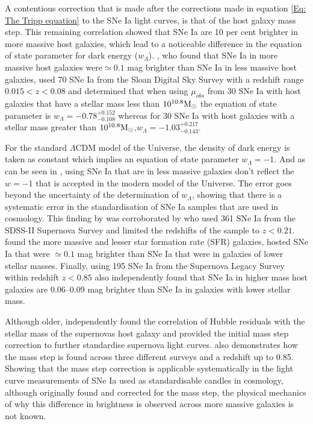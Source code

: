 A contentious correction that is made after the corrections made in equation \ref{Eq: The Tripp equation} to the SNe Ia light curves, is that of the host galaxy mass step\parencite{kelly_hubble_2010,sullivan_dependence_2010, lampeitl_effect_2010}. This remaining correlation showed that SNe Ia are 10 per cent brighter in more massive host galaxies, which lead to a noticeable difference in the equation of state parameter for dark energy (\(w_{\Lambda}\)). \textcite{kelly_hubble_2010}, who found that SNe Ia in more massive host galaxies were\(\simeq 0.1\) mag brighter than SNe Ia in less massive host galaxies, used 70 SNe Ia from the Sloan Digital Sky Survey with a redshift range \(0.015<z<0.08\) and determined that when using \(\mu_{obs}\) from 30 SNe Ia with host galaxies that have a stellar mass less than \(10^{10.8}\textup{M}_\odot\) the equation of state parameter is  \(w_{\Lambda} = -0.78^{+0.152}_{-0.108}\) whereas for 30 SNe Ia with host galaxies with a stellar mass greater than \(10^{10.8}\textup{M}_\odot\),\(w_{\Lambda} = -1.03^{+0.217}_{-0.143}\).

For the standard \(\Lambda\)CDM model of the Universe, the density of dark energy is taken as constant which implies an equation of state parameter \(w_{\Lambda}=-1\). And as can be seen in \textcite{kelly_hubble_2010}, using SNe Ia that are in less massive galaxies don't reflect the \(w=-1\) that is accepted in the modern model of the Universe. The error goes beyond the uncertainty of the determination of \(w_{\Lambda}\), showing that there is a systematic error in the standardisation of SNe Ia samples that are used in cosmology. This finding by \textcite{kelly_hubble_2010} was corroborated by \textcite{lampeitl_effect_2010} who used 361 SNe Ia from the SDSS-II Supernova Survey and limited the redshifts of the sample to \(z<0.21\). \textcite{lampeitl_effect_2010} found the more massive and lesser star formation rate (SFR) galaxies, hosted SNe Ia that were \(\simeq 0.1\) mag brighter than SNe Ia that were in galaxies of lower stellar masses. Finally, \textcite{sullivan_dependence_2010} using 195 SNe Ia from the Supernova Legacy Survey within redshift \(z <0.85\) also independently found that SNe Ia in higher mass host galaxies are 0.06–0.09 mag brighter than SNe Ia in galaxies with lower stellar mass. 

Although older, \textcite{kelly_hubble_2010,sullivan_dependence_2010, lampeitl_effect_2010} independently found the correlation of Hubble residuals with the stellar mass of the supernovas host galaxy and provided the initial mass step correction to further standardise supernova light curves. \textcite{kelly_hubble_2010,sullivan_dependence_2010, lampeitl_effect_2010} also demonstrates how the mass step is found across three different surveys and a redshift up to 0.85. Showing that the mass step correction is applicable systematically in the light curve measurements of SNe Ia used as standardisable candles in cosmology, although \textcite{kelly_hubble_2010,sullivan_dependence_2010, lampeitl_effect_2010} originally found and corrected for the mass step, the physical mechanics of why this difference in brightness is observed across more massive galaxies is not known. 

